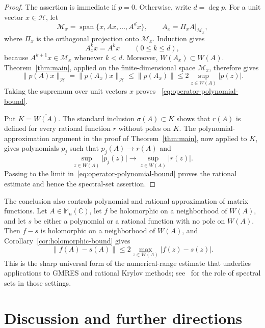 \documentclass[preprints,article,submit,oneauthor]{Definitions/mdpi}
\theoremstyle{mdpi}
\theoremstyle{definition}
\newcommand{\C}{\mathbb C}
\newcommand{\Mn}{\mathbb M_n(\C)}
\begin{document}
\begin{proof}
The assertion is immediate if $p=0$.  Otherwise, write $d=\deg p$.
For a unit vector $x\in\mathcal H$, let
\[
  \mathcal M_x=\operatorname{span}\{x,Ax,\ldots,A^d x\},
  \qquad
  A_x=\left.\Pi_x A\right|_{\mathcal M_x},
\]
where $\Pi_x$ is the orthogonal projection onto
$\mathcal M_x$.  Induction gives
\begin{equation}
  A_x^k x=A^k x \qquad(0\leq k\leq d),
  \label{eq:Krylov-agreement}
\end{equation}
because $A^{k+1}x\in\mathcal M_x$ whenever $k<d$.  Moreover,
$W(A_x)\subset W(A)$.  Theorem~\ref{thm:main}, applied on the
finite-dimensional space $\mathcal M_x$, therefore gives
\[
  \lVert p(A)x\rVert_{\mathcal H}
  =\lVert p(A_x)x\rVert_{\mathcal H}
  \leq\lVert p(A_x)\rVert
  \leq2\sup_{z\in W(A)}\lvert p(z)\rvert.
\]
Taking the supremum over unit vectors $x$ proves~%
\eqref{eq:operator-polynomial-bound}.

Put $K=\overline{W(A)}$.  The standard inclusion
$\sigma(A)\subset K$ shows that $r(A)$ is defined for every rational
function $r$ without poles on $K$.  The polynomial-approximation
argument in the proof of Theorem~\ref{thm:main}, now applied to $K$,
gives polynomials $p_j$ such that $p_j(A)\to r(A)$ and
\[
  \sup_{z\in W(A)}\lvert p_j(z)\rvert
  \longrightarrow
  \sup_{z\in W(A)}\lvert r(z)\rvert.
\]
Passing to the limit in~\eqref{eq:operator-polynomial-bound} proves the
rational estimate and hence the spectral-set assertion.
\end{proof}

The conclusion also controls polynomial and rational approximation of
matrix functions.  Let $A\in\Mn$, let $f$ be holomorphic on a
neighborhood of $W(A)$, and let $s$ be either a polynomial or a
rational function with no pole on $W(A)$.  Then $f-s$ is holomorphic on
a neighborhood of $W(A)$, and Corollary~\ref{cor:holomorphic-bound}
gives
\begin{equation}
  \lVert f(A)-s(A)\rVert
  \leq2\max_{z\in W(A)}\lvert f(z)-s(z)\rvert.
  \label{eq:matrix-function-error}
\end{equation}
This is the sharp universal form of the numerical-range estimate that
underlies applications to GMRES and rational Krylov methods; see~%
\cite{ChoiGreenbaum2015,CrouzeixGreenbaum2019,ChenGreenbaumTrogdon2025}
for the role of spectral sets in those settings.

\section{Discussion and further directions}
\label{sec:outlook}
\end{document}

